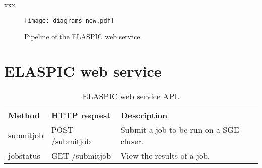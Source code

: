 xxx

\begin{figure}[H]
	\centering
	\texttt{[image: diagrams\_new.pdf]}
	\caption[pipeline]{Pipeline of the ELASPIC web service.}
\end{figure}



\section{ELASPIC web service}

\begin{table}[H]
	\centering
	\caption{ELASPIC web service API.}
	\label{my-label}
	\begin{tabular}{lll}
	\textbf{Method} & \textbf{HTTP request} & \textbf{Description} \\
	submitjob & POST /submitjob & Submit a job to be run on a SGE cluser. \\
	jobstatus & GET /submitjob & View the results of a job.
	\end{tabular}
\end{table}

